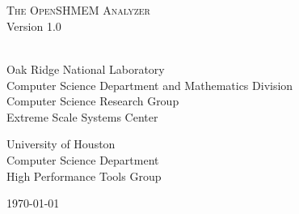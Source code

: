\begin{titlepage}
  \begin{center}

    \vspace{1.0in} ~ \\

    \HRule \\[0.1in]
    {\LARGE \textsc{The OpenSHMEM Analyzer}} \\
    \vspace{0.2in}
    {\LARGE Version 1.0} \\
    \HRule \\[0.5in]

    \vspace{1.0in}

    Oak Ridge National Laboratory \\
    Computer Science Department and Mathematics Division \\
    Computer Science Research Group \\
    Extreme Scale Systems Center \\

    \vspace{0.4in}

    University of Houston \\
    Computer Science Department \\
    High Performance Tools Group

    \vspace{1.0in}

    \today

  \end{center}
\end{titlepage}
